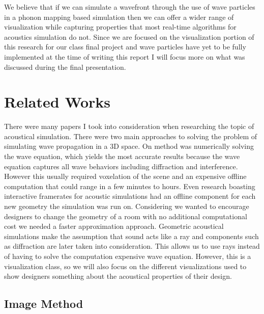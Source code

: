 \documentclass{thesis}
\begin{document}
We believe that if we can simulate a wavefront through the use of wave particles  in a phonon mapping based simulation then we can offer a wider range of visualization while capturing properties that most real-time algorithms for acoustics simulation do not.
Since we are focused on the visualization portion of this research for our class final project and wave particles have yet to be fully implemented at the time of writing this report I will focus more on what was discussed during the final presentation.\\


\chapter{Related Works}
There were many papers I took into consideration when researching the topic of acoustical simulation. There were two main approaches to solving the problem of simulating wave propagation in a 3D space.  On method was numerically solving the wave equation, which yields the most accurate results because the wave equation captures all wave behaviors including diffraction and interference. However this usually required voxelation of the scene and an expensive offline computation that could range in a few minutes to hours. Even research boasting interactive framerates for acoustic simulations had an offline component for each new geometry the simulation was run on. Considering we wanted to encourage designers to change the geometry of a room with no additional computational cost we needed a faster approximation approach. 
Geometric acoustical simulations make the assumption that sound acts like a ray and components such as diffraction are later taken into consideration. This allows us to use rays instead of having to solve the computation expensive wave equation. However, this is a visualization class, so we will also focus on the different visualizations used to show designers something about the acoustical properties of their design.

\section{Image Method}
\end{document}
